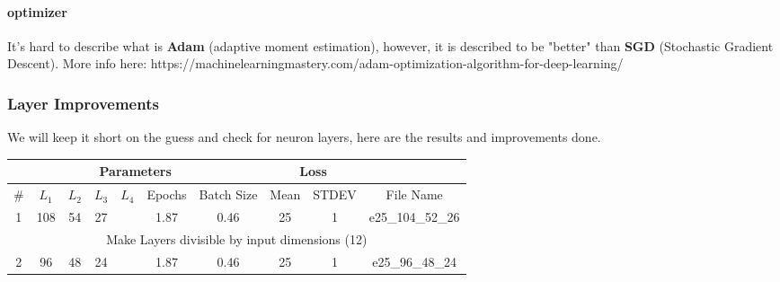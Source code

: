 \paragraph{optimizer} It's hard to describe what is \textbf{Adam} (adaptive moment estimation), however, it is described to be "better" than \textbf{SGD} (Stochastic Gradient Descent). More info here: https://machinelearningmastery.com/adam-optimization-algorithm-for-deep-learning/

\subsubsection{Layer Improvements}

We will keep it short on the guess and check for neuron layers, here are the results and improvements done.

\begin{tabular}{|c|c|c|c|c|c|c|c|c|c|} 
\hline
\multicolumn{7}{|c|}{Parameters} & \multicolumn{2}{|c|}{Loss} & {} \\
\hline
\# & $L_1$ & $L_2$ & $L_3$ & $L_4$ & Epochs & Batch Size & Mean & STDEV & File Name \\
\hline
1 & 108 & 54 & 27 & {} & 1.87 & 0.46 & 25 & 1 & e25\_104\_52\_26 \\
\hline
\multicolumn{10}{|c|}{Make Layers divisible by input dimensions (12)} \\
\hline
2 & 96 & 48 & 24 & {} & 1.87 & 0.46 & 25 & 1 & e25\_96\_48\_24 \\
\hline
\end{tabular}	



